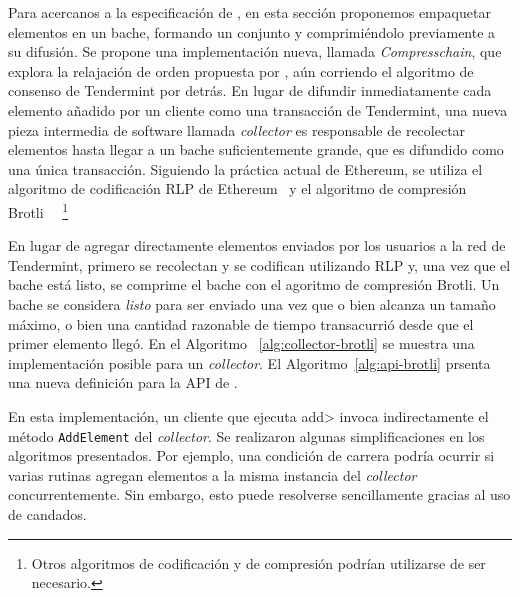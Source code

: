 Para acercanos a la especificación de \setchain, en esta sección proponemos
empaquetar elementos en un bache, formando un conjunto y comprimiéndolo
previamente a su difusión.
%
Se propone una implementación nueva, llamada \emph{Compresschain}, que explora
la relajación de orden propuesta por \setchain, aún corriendo el algoritmo de
consenso de Tendermint por detrás.
%
En lugar de difundir inmediatamente cada elemento añadido por un cliente como una
transacción de Tendermint, una nueva pieza intermedia de software llamada \textit{collector}
es responsable de recolectar elementos hasta llegar a un bache suficientemente grande,
que es difundido como una única transacción.
%
Siguiendo la práctica actual de Ethereum, se utiliza el algoritmo de codificación RLP de
Ethereum~\cite{ethereum} y el algoritmo de compresión Brotli~\cite{brotli.compressor}
~\footnote{ Otros algoritmos de codificación y de compresión podrían utilizarse de ser necesario.}
%
%

%

En lugar de agregar directamente elementos enviados por los usuarios a la red de Tendermint,
primero se recolectan y se codifican utilizando RLP y, una vez que el bache está listo,
se comprime el bache con el agoritmo de compresión Brotli.
%
Un bache se considera \textit{listo} para ser enviado una vez que o bien alcanza un tamaño máximo,
o bien una cantidad razonable de tiempo transacurrió desde que el primer elemento llegó. 
%
En el Algoritmo ~\ref{alg:collector-brotli} se muestra una implementación posible para un \textit{collector}.
El Algoritmo~\ref{alg:api-brotli} prsenta una nueva definición para la API de \setchain.

%
En esta implementación, un cliente que ejecuta \<add> invoca indirectamente el método \texttt{AddElement}
del \textit{collector}.
%
Se realizaron algunas simplificaciones en los algoritmos presentados. Por ejemplo, una condición de carrera
podría ocurrir si varias rutinas agregan elementos a la misma instancia del \textit{collector} concurrentemente.
Sin embargo, esto puede resolverse sencillamente gracias al uso de candados.






%

